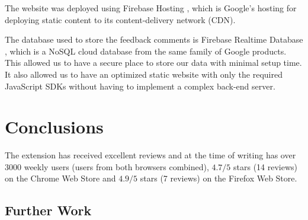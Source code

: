 \documentclass[bsc,frontabs,twoside,singlespacing,parskip,deptreport]{infthesis}
\begin{document}
The website was deployed using Firebase Hosting \cite{A8}, which is Google's hosting for deploying static content to its content-delivery network (CDN).

The database used to store the feedback comments is Firebase Realtime Database \cite{A9}, which is a NoSQL cloud database from the same family of Google products. This allowed us to have a secure place to store our data with minimal setup time. It also allowed us to have an optimized static website with only the required JavaScript SDKs without having to implement a complex back-end server.

\chapter{Conclusions}
The extension has received excellent reviews and at the time of writing has over 3000 weekly users (users from both browsers combined), $4.7/5$ stars (14 reviews) on the Chrome Web Store and $4.9/5$ stars (7 reviews) on the Firefox Web Store.

\section{Further Work}




\end{document}
